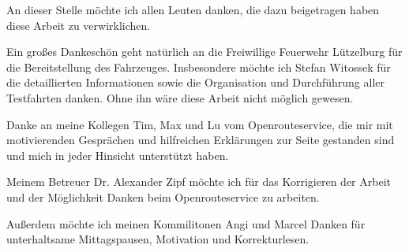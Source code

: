 An dieser Stelle möchte ich allen Leuten danken, die dazu beigetragen haben diese Arbeit zu verwirklichen.\par
\vspace{0.5cm}
Ein großes Dankeschön geht natürlich an die Freiwillige Feuerwehr Lützelburg für die Bereitstellung des Fahrzeuges.
Insbesondere möchte ich Stefan Witossek für die detaillierten Informationen sowie die Organisation und Durchführung aller Testfahrten danken.
Ohne ihn wäre diese Arbeit nicht möglich gewesen.\par
\vspace{0.5cm}
Danke an meine Kollegen Tim, Max und Lu vom Openrouteservice, die mir mit motivierenden Gesprächen und hilfreichen Erklärungen zur Seite gestanden sind und mich in jeder Hinsicht unterstützt haben.\par
\vspace{0.5cm}
Meinem Betreuer Dr. Alexander Zipf möchte ich für das Korrigieren der Arbeit und der Möglichkeit Danken beim Openrouteservice zu arbeiten.\par
\vspace{0.5cm}
Außerdem möchte ich meinen Kommilitonen Angi und Marcel Danken für unterhaltsame Mittagspausen, Motivation und Korrekturlesen.

\newpage
{}
